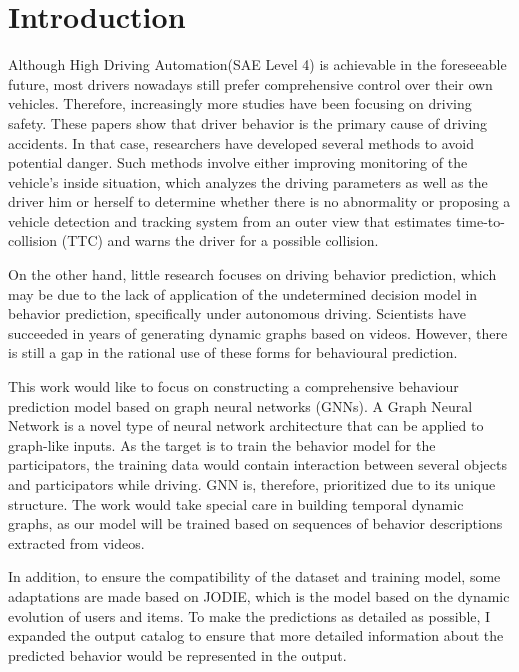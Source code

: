 
\chapter{Introduction}\label{chapter:introduction}
Although High Driving Automation(SAE Level 4) is achievable in the foreseeable future\cite{inagaki2019critique}, most drivers nowadays still prefer comprehensive control over their own vehicles. Therefore, increasingly more studies have been focusing on driving safety\cite{lee2005driving,lee2008fifty}. 
These papers show that driver behavior is the primary cause of driving accidents. In that case, researchers have developed several methods to avoid potential danger. Such methods involve either improving monitoring of the vehicle's inside situation, which analyzes the driving parameters as well as the driver him or herself to determine whether there is no abnormality\cite{karrouchi2023driving} or proposing a vehicle detection and tracking system from an outer view that estimates time-to-collision (TTC) and warns the driver for a possible collision\cite{aytekin2010increasing}.

On the other hand, little research focuses on driving behavior prediction, which may be due to the lack of application of the undetermined decision model in behavior prediction, specifically under autonomous driving. Scientists have succeeded in years of generating dynamic graphs based on videos. However, there is still a gap in the rational use of these forms for behavioural prediction.

This work would like to focus on constructing a comprehensive behaviour prediction model based on graph neural networks (GNNs). A Graph Neural Network is a novel type of neural network architecture that can be applied to graph-like inputs. As the target is to train the behavior model for the participators, the training data would contain interaction between several objects and participators while driving. GNN is, therefore, prioritized due to its unique structure. The work would take special care in building temporal dynamic graphs, as our model will be trained based on sequences of behavior descriptions extracted from videos.

In addition, to ensure the compatibility of the dataset and training model,  some adaptations are made based on JODIE\cite{kumar2019predicting}, which is the model based on the dynamic evolution of users and items. To make the predictions as detailed as possible, I expanded the output catalog to ensure that more detailed information about the predicted behavior would be represented in the output.

